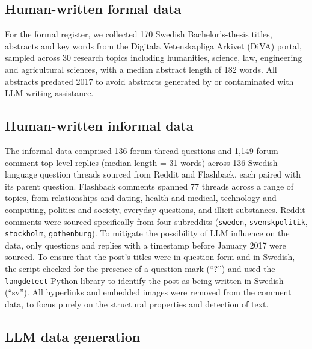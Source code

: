 \documentclass[thesis]{cluu}
\begin{document}
\subsection{Human-written formal data}

For the formal register, we collected 170 Swedish Bachelor's-thesis titles, abstracts and key words from the Digitala Vetenskapliga Arkivet (DiVA) portal, sampled across 30 research topics including humanities, science, law, engineering and agricultural sciences, with a median abstract length of 182 words. All abstracts predated 2017 to avoid abstracts generated by or contaminated with LLM writing assistance.

\subsection{Human-written informal data}

The informal data comprised 136 forum thread questions and 1,149 forum-comment top-level replies (median length = 31 words) across 136 Swedish-language question threads sourced from Reddit and Flashback, each paired with its parent question. Flashback comments spanned 77 threads across a range of topics, from relationships and dating, health and medical, technology and computing, politics and society, everyday questions, and illicit substances. Reddit comments were sourced specifically from four subreddits (\texttt{sweden}, \texttt{svenskpolitik}, \texttt{stockholm}, \texttt{gothenburg}). To mitigate the possibility of LLM influence on the data, only questions and replies with a timestamp before January 2017 were sourced. To ensure that the post's titles were in question form and in Swedish, the script checked for the presence of a question mark (``?'') and used the \texttt{langdetect} Python library to identify the post as being written in Swedish (``sv''). All hyperlinks and embedded images were removed from the comment data, to focus purely on the structural properties and detection of text.

\subsection{LLM data generation}
\end{document}
